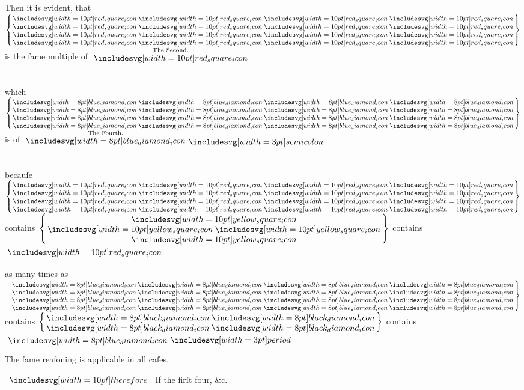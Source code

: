 \documentclass[11pt,preview]{standalone}
\begin{document}
\begin{center}
    Then it is evident, that $\left\{\hspace{-1.5ex}\begin{array}{c} \redsquares \\ \redsquares \\ \redsquares \\ \redsquares \end{array}\hspace{-1.5ex}\right\}$ is the ſame multiple of $\overset{\text{\scriptsize The Second.}}{\redsquare}$\\
    \hfill\\
    \hfill\\
    which $\left\{\hspace{-1.5ex}\begin{array}{c} \bluediamonds \\ \bluediamonds \\ \bluediamonds \\ \bluediamonds \end{array}\hspace{-1.5ex}\right\}$ is of $\overset{\text{\scriptsize The Fourth.}}{\bluediamond} \bsemicolon$\\
    \hfill\\
    \hfill\\
    becauſe $\left\{\hspace{-1.5ex}\begin{array}{c} \redsquares \\ \redsquares \\ \redsquares \\ \redsquares \end{array}\hspace{-1.5ex}\right\}$ contains $\left\{\hspace{-1.5ex}\begin{array}{c} \yellowsquare \\ \yellowsquares \\ \yellowsquare \end{array}\hspace{-1.5ex}\right\}$ contains $\redsquare$\\
    \hfill\\
    as many times as\\
    $\left.\begin{array}{c} \bluediamonds \\ \bluediamonds \\ \bluediamonds \\ \bluediamonds \end{array}\hspace{-1.5ex}\right\}$ contains $\left\{\hspace{-1.5ex}\begin{array}{c} \blackdiamonds \\ \blackdiamonds \end{array}\hspace{-1.5ex}\right\}$ contains $\bluediamond \bperiod$
\end{center}

\hfill

\hfill

The ſame reaſoning is applicable in all caſes.

\hfill

$\btherefore$ If the firſt four, \&c.
\end{document}

